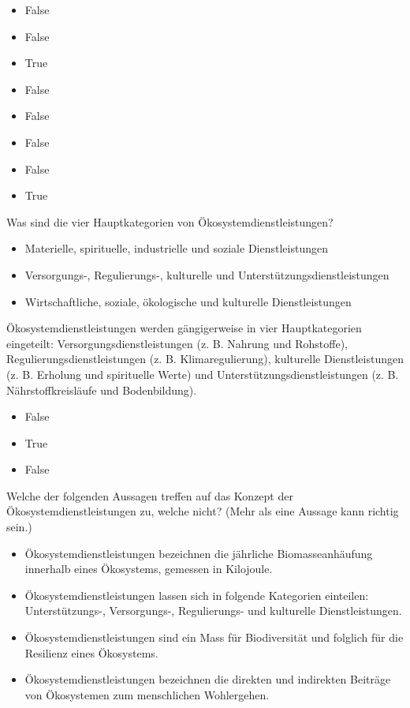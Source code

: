 \documentclass[
  nswissgerman,
  a4paper,
  DIV=11,
  numbers=noendperiod,
  oneside,
  openany]{scrreprt}
\providecommand{\tightlist}{%
  \setlength{\itemsep}{0pt}\setlength{\parskip}{0pt}}
\begin{document}
\begin{itemize}
\tightlist
\item
  False
\item
  False
\item
  True
\item
  False
\item
  False
\item
  False
\item
  False
\item
  True
\end{itemize}

Was sind die vier Hauptkategorien von Ökosystemdienstleistungen?

\begin{itemize}
\tightlist
\item[$\square$]
  Materielle, spirituelle, industrielle und soziale Dienstleistungen
\item[$\square$]
  Versorgungs-, Regulierungs-, kulturelle und
  Unterstützungsdienstleistungen
\item[$\square$]
  Wirtschaftliche, soziale, ökologische und kulturelle Dienstleistungen
\end{itemize}

Ökosystemdienstleistungen werden gängigerweise in vier Hauptkategorien
eingeteilt: Versorgungsdienstleistungen (z. B. Nahrung und Rohstoffe),
Regulierungsdienstleistungen (z. B. Klimaregulierung), kulturelle
Dienstleistungen (z. B. Erholung und spirituelle Werte) und
Unterstützungsdienstleistungen (z. B. Nährstoffkreisläufe und
Bodenbildung).

\begin{itemize}
\tightlist
\item
  False
\item
  True
\item
  False
\end{itemize}

Welche der folgenden Aussagen treffen auf das Konzept der
Ökosystemdienstleistungen zu, welche nicht? (Mehr als eine Aussage kann
richtig sein.)

\begin{itemize}
\tightlist
\item[$\square$]
  Ökosystemdienstleistungen bezeichnen die jährliche Biomasseanhäufung
  innerhalb eines Ökosystems, gemessen in Kilojoule.
\item[$\square$]
  Ökosystemdienstleistungen lassen sich in folgende Kategorien
  einteilen: Unterstützungs-, Versorgungs-, Regulierungs- und kulturelle
  Dienstleistungen.
\item[$\square$]
  Ökosystemdienstleistungen sind ein Mass für Biodiversität und folglich
  für die Resilienz eines Ökosystems.
\item[$\square$]
  Ökosystemdienstleistungen bezeichnen die direkten und indirekten
  Beiträge von Ökosystemen zum menschlichen Wohlergehen.
\end{itemize}
\end{document}
